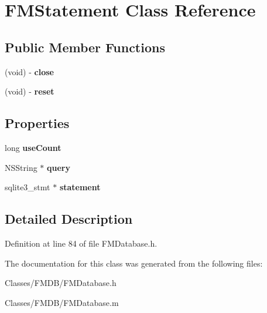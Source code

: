 \hypertarget{interface_f_m_statement}{
\section{FMStatement Class Reference}
\label{interface_f_m_statement}
}
\subsection*{Public Member Functions}
\begin{DoxyCompactItemize}
\item 
\hypertarget{interface_f_m_statement_a5ae591df94fc66ccb85cbb6565368bca}{
(void) -\/ {\bfseries close}}
\label{interface_f_m_statement_a5ae591df94fc66ccb85cbb6565368bca}

\item 
\hypertarget{interface_f_m_statement_ad20897c5c8bd47f5d4005989bead0e55}{
(void) -\/ {\bfseries reset}}
\label{interface_f_m_statement_ad20897c5c8bd47f5d4005989bead0e55}

\end{DoxyCompactItemize}
\subsection*{Properties}
\begin{DoxyCompactItemize}
\item 
\hypertarget{interface_f_m_statement_a46679f19edb79480727446d6a3eb9ef9}{
long {\bfseries useCount}}
\label{interface_f_m_statement_a46679f19edb79480727446d6a3eb9ef9}

\item 
\hypertarget{interface_f_m_statement_a936eb1d8a837ce00b5f6bde653f8901e}{
NSString $\ast$ {\bfseries query}}
\label{interface_f_m_statement_a936eb1d8a837ce00b5f6bde653f8901e}

\item 
\hypertarget{interface_f_m_statement_ac02429270d077de86cba910e47428fa2}{
sqlite3\_\-stmt $\ast$ {\bfseries statement}}
\label{interface_f_m_statement_ac02429270d077de86cba910e47428fa2}

\end{DoxyCompactItemize}


\subsection{Detailed Description}


Definition at line 84 of file FMDatabase.h.



The documentation for this class was generated from the following files:\begin{DoxyCompactItemize}
\item 
Classes/FMDB/FMDatabase.h\item 
Classes/FMDB/FMDatabase.m\end{DoxyCompactItemize}
